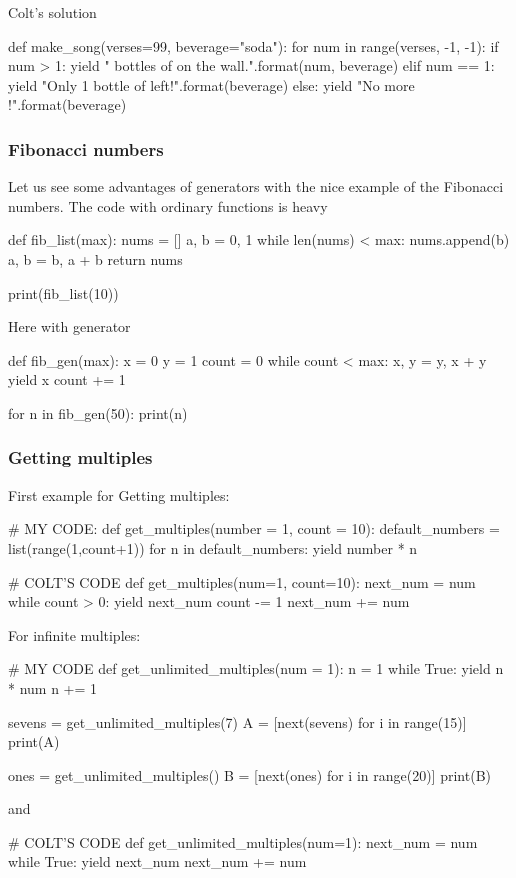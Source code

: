 Colt's solution
\begin{listing}{1}
def make_song(verses=99, beverage="soda"):
    for num in range(verses, -1, -1):
        if num > 1:
            yield "{} bottles of {} on the wall.".format(num, beverage)
        elif num == 1:
            yield "Only 1 bottle of {} left!".format(beverage)
        else:
            yield "No more {}!".format(beverage)    
\end{listing}


\subsubsection{Fibonacci numbers}

Let us see some advantages of generators with the nice example of the Fibonacci numbers. The code with ordinary functions is heavy
\begin{listing}{1}
def fib_list(max):
    nums = []
    a, b = 0, 1
    while len(nums) < max:
        nums.append(b)
        a, b = b, a + b
    return nums

print(fib_list(10))    
\end{listing}

Here with generator
\begin{listing}{1}
def fib_gen(max):
    x = 0
    y = 1
    count = 0
    while count < max: 
        x, y = y, x + y
        yield x
        count += 1

for n in fib_gen(50):
    print(n)      
\end{listing}


\subsubsection{Getting multiples}

First example for Getting multiples:
\begin{listing}{1}
# MY CODE: 
def get_multiples(number = 1, count = 10):
    default_numbers = list(range(1,count+1))
    for n in default_numbers:
        yield number * n
        
# COLT'S CODE 
def get_multiples(num=1, count=10):
    next_num = num
    while count > 0:
        yield next_num
        count -= 1
        next_num += num        
\end{listing}

For infinite multiples:
\begin{listing}{1}
# MY CODE 
def get_unlimited_multiples(num = 1):
    n = 1
    while True:
        yield n * num
        n += 1


sevens = get_unlimited_multiples(7)
A = [next(sevens) for i in range(15)] 
print(A)

ones = get_unlimited_multiples()
B = [next(ones) for i in range(20)] 
print(B)    
\end{listing}
and 
\begin{listingcont}
# COLT'S CODE     
def get_unlimited_multiples(num=1):
    next_num = num
    while True:
        yield next_num
        next_num += num
\end{listingcont}


